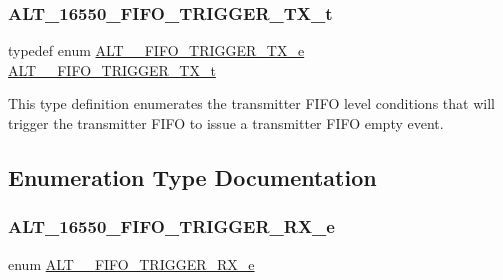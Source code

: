 \subsubsection{\texorpdfstring{ALT\_16550\_FIFO\_TRIGGER\_TX\_t}{ALT\_16550\_FIFO\_TRIGGER\_TX\_t}}
{\footnotesize\ttfamily typedef enum \mbox{\hyperlink{group__UART__FIFO_gaeef8e1e6b4ec8b82200067bf4ba2e04e}{A\+L\+T\+\_\+\_\+\+F\+I\+F\+O\+\_\+\+T\+R\+I\+G\+G\+E\+R\+\_\+\+T\+X\+\_\+e}}
 \mbox{\hyperlink{group__UART__FIFO_gac427c853fffa7be41f636f723b48a2e7}{A\+L\+T\+\_\+\_\+\+F\+I\+F\+O\+\_\+\+T\+R\+I\+G\+G\+E\+R\+\_\+\+T\+X\+\_\+t}}}

This type definition enumerates the transmitter F\+I\+FO level conditions that will trigger the transmitter F\+I\+FO to issue a transmitter F\+I\+FO empty event. 

\subsection{Enumeration Type Documentation}
\mbox{\label{group__UART__FIFO_ga2bfcdb68fa8def11f82daafbdab9b32c}} 
\subsubsection{\texorpdfstring{ALT\_16550\_FIFO\_TRIGGER\_RX\_e}{ALT\_16550\_FIFO\_TRIGGER\_RX\_e}}
{\footnotesize\ttfamily enum \mbox{\hyperlink{group__UART__FIFO_ga2bfcdb68fa8def11f82daafbdab9b32c}{A\+L\+T\+\_\+\_\+\+F\+I\+F\+O\+\_\+\+T\+R\+I\+G\+G\+E\+R\+\_\+\+R\+X\+\_\+e}}}

